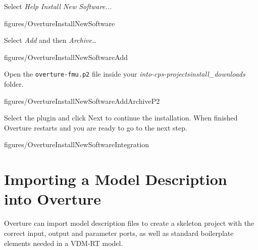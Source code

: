 \documentclass[11pt,a4paper]{../tutorial}
\begin{document}
\begin{instructions}
\item Select \emph{Help \menusep Install New Software...}

\begin{annotation}[width=0.85\linewidth]{figures/OvertureInstallNewSoftware}
\end{annotation}

\item Select \emph{Add} and then \emph{Archive}\ldots

\begin{annotation}[width=0.85\linewidth,trim=0 260 0 0,clip]{figures/OvertureInstallNewSoftwareAdd}
\end{annotation}

\newpage

\item Open the \verb'overture-fmu.p2' file inside your \emph{into-cps-projects\pathsep install\_downloads} folder. 

\begin{annotation}[width=0.6\linewidth]{figures/OvertureInstallNewSoftwareAddArchiveP2}
\end{annotation}

\item Select the plugin and click Next to continue the installation. When finished Overture restarts and you are ready to go to the next step. 

\begin{annotation}[width=0.8\linewidth]{figures/OvertureInstallNewSoftwareIntegration}
	
\end{annotation}

\end{instructions}
\newpage


\section{Importing a Model Description into Overture}

Overture can import model description files to create a skeleton project with the correct input, output and parameter ports, as well as standard boilerplate elements needed in a VDM-RT model.
\end{document}
